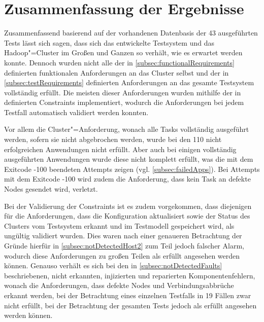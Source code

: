 \section{Zusammenfassung der Ergebnisse}
\label{sec:evaluationResults}

Zusammenfassend basierend auf der vorhandenen Datenbasis der 43 ausgeführten Tests lässt sich sagen, dass sich das entwickelte Testsystem und das Hadoop"=Cluster im Großen und Ganzen so verhält, wie es erwartet werden konnte.
Dennoch wurden nicht alle der in \autoref{subsec:functionalRequirements} definierten funktionalen Anforderungen an das Cluster selbst und der in \autoref{subsec:testRequirements} definierten Anforderungen an das gesamte Testsystem vollständig erfüllt.
Die meisten dieser Anforderungen wurden mithilfe der in  definierten Constraints implementiert, wodurch die Anforderungen bei jedem Testfall automatisch validiert werden konnten.

Vor allem die Cluster"=Anforderung, wonach alle Tasks vollständig ausgeführt werden, sofern sie nicht abgebrochen werden, wurde bei den 110 nicht erfolgreichen Anwendungen nicht erfüllt.
Aber auch bei einigen vollständig ausgeführten Anwendungen wurde diese nicht komplett erfüllt, was die mit dem Exitcode -100 beendeten Attempts zeigen (vgl. \autoref{subsec:failedApps}).
Bei Attempts mit dem Exitcode -100 wird zudem die Anforderung, dass kein Task an defekte Nodes gesendet wird, verletzt.

Bei der Validierung der Constraints ist es zudem vorgekommen, dass diejenigen für die Anforderungen, dass die Konfiguration aktualisiert sowie der Status des Clusters vom Testsystem erkannt und im Testmodell gespeichert wird, als ungültig validiert wurden.
Dies waren nach einer genaueren Betrachtung der Gründe hierfür in \autoref{subsec:notDetectedHost2} zum Teil jedoch falscher Alarm, wodurch diese Anforderungen zu großen Teilen als erfüllt angesehen werden können.
Genauso verhält es sich bei den in \autoref{subsec:notDetectedFaults} beschriebenen, nicht erkannten, injizierten und reparierten Komponentenfehlern, wonach die Anforderungen, dass defekte Nodes und Verbindungsabbrüche erkannt werden, bei der Betrachtung eines einzelnen Testfalls in 19 Fällen zwar nicht erfüllt, bei der Betrachtung der gesamten Tests jedoch als erfüllt angesehen werden können.

